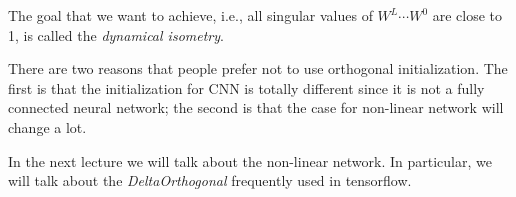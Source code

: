 The goal that we want to achieve, i.e., all singular values of $W^L\cdots W^0$ are close to 1, is called the \emph{dynamical isometry}.

\begin{remark}
There are two reasons that people prefer not to use orthogonal initialization.
The first is that the initialization for CNN is totally different since it is not a fully connected neural network;
the second is that the case for non-linear network will change a lot.
\end{remark}

In the next lecture we will talk about the non-linear network. In particular, we will talk about the \emph{DeltaOrthogonal} frequently used in tensorflow.








